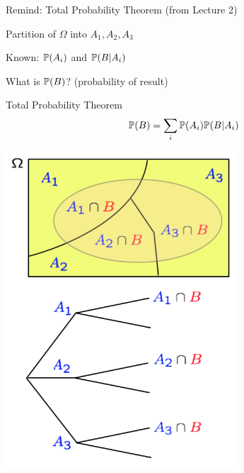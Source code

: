 \documentclass[fleqn,aspectratio=169]{beamer}
\begin{document}
\begin{frame}{Remind: Total Probability Theorem (from Lecture 2)}

{
\plitemsep 0.1in
\bci [$\circ$]

\item Partition of $\Omega$ into $A_1,A_2,A_3$

\item Known: $\mathbb{P}( A_i )$ and $\mathbb{P}( B | A_i )$ 

\item What is $\mathbb{P}( B )$? (probability of result)

\bigskip
\medskip

\begin{block}{Total Probability Theorem}
$$
\mathbb{P}( B ) = \sum_{i} \mathbb{P}( A_i ) \mathbb{P}( B | A_i )
$$
\end{block}

\eci 
}
{
\centering
\includegraphics[width=0.65\textwidth]{L2_total_ex.png}
}

\end{frame}
\end{document}
